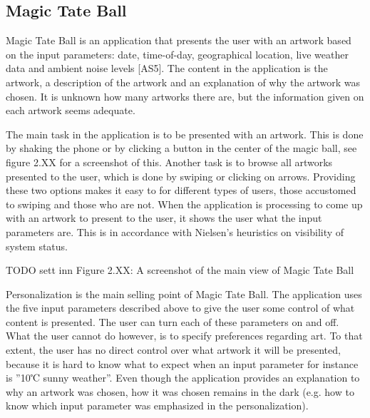 \subsection{Magic Tate Ball}

Magic Tate Ball is an application that presents the user with an artwork based on the input parameters: date, time-of-day, geographical location, live weather data and ambient noise levels [AS5]. The content in the application is the artwork, a description of the artwork and an explanation of why the artwork was chosen. It is unknown how many artworks there are, but the information given on each artwork seems adequate. \newline

The main task in the application is to be presented with an artwork. This is done by shaking the phone or by clicking a button in the center of the magic ball, see figure 2.XX for a screenshot of this. Another task is to browse all artworks presented to the user, which is done by swiping or clicking on arrows. Providing these two options makes it easy to for different types of users, those accustomed to swiping and those who are not. When the application is processing to come up with an artwork to present to the user, it shows the user what the input parameters are. This is in accordance with Nielsen’s heuristics on visibility of system status. \newline

TODO sett inn Figure 2.XX: A screenshot of the main view of Magic Tate Ball

Personalization is the main selling point of Magic Tate Ball. The application uses the five input parameters described above to give the user some control of what content is presented. The user can turn each of these parameters on and off. What the user cannot do however, is to specify preferences regarding art. To that extent, the user has no direct control over what artwork it will be presented, because it is hard to know what to expect when an input parameter for instance is ”10℃ sunny weather”. Even though the application provides an explanation to why an artwork was chosen, how it was chosen remains in the dark (e.g. how to know which input parameter was emphasized in the personalization).

\cleardoublepage